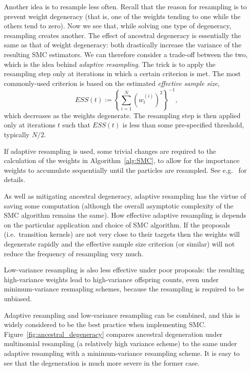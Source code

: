 Another idea is to resample less often. Recall that the reason for resampling is to prevent weight degeneracy (that is, one of the weights tending to one while the others tend to zero). Now we see that, while solving one type of degeneracy, resampling creates another. The effect of ancestral degeneracy is essentially the same as that of weight degeneracy: both drastically increase the variance of the resulting SMC estimators. 
We can therefore consider a trade-off between the two, which is the idea behind \emph{adaptive resampling}\seb{[citation]}.
The trick is to apply the resampling step only at iterations in which a certain criterion is met. The most  commonly-used criterion is based on the estimated \emph{effective sample size},
\begin{equation*}
ESS(t) := \left\{ \sum_{i=1}^N (w_t^{(i)})^2 \right\}^{-1} ,
\end{equation*}
which decreases as the weights degenerate.
The resampling step is then applied only at iterations $t$ such that $ESS(t)$ is less than some pre-specified threshold, typically $N/2$\seb{[citation]}.

If adaptive resampling is used, some trivial changes are required to the calculation of the weights in Algorithm~\ref{alg:SMC}, to allow for the importance weights to accumulate sequentially until the particles are resampled. See e.g.\ \textcite[Section 10.2]{chopin2020} for details.

As well as mitigating ancestral degeneracy, adaptive resampling has the virtue of saving some computation (although the overall asymptotic complexity of the SMC algorithm remains the same).
How effective adaptive resampling is depends on the particular application and choice of SMC algorithm. If the proposals (i.e.\ transition kernels) are not very close to their targets then the weights will degenerate rapidly and the effective sample size criterion (or similar) will not reduce the frequency of resampling very much.

Low-variance resampling is also less effective under poor proposals: the resulting high-variance weights lead to high-variance offspring counts, even under minimum-variance resmapling schemes, because the resampling is required to be unbiased.

Adaptive resampling and low-variance resampling can be combined, and this is widely considered to be the best practice when implementing SMC.
Figure~\ref{fig:ancestral_degeneracy} compares ancestral degeneration under multinomial resampling (a relatively high variance scheme) to the same under adaptive resampling with a minimum-variance resampling scheme.
It is easy to see that the degeneration is much more severe in the former case.

